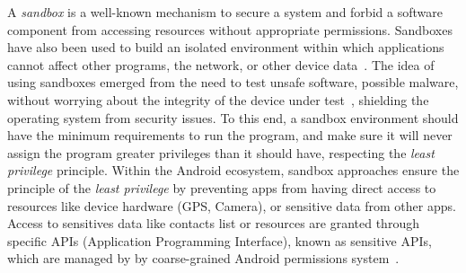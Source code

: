 A \emph{sandbox}
is a well-known mechanism to secure a system and forbid a software component from accessing
resources without appropriate permissions. Sandboxes have also been used to build an isolated
environment within which applications cannot affect other programs, the network, or other device
data~\cite{DBLP:journals/peerj-cs/MaassSCS16}. The idea of using sandboxes emerged from the
need to test unsafe software, possible malware, without worrying about the integrity of the
device under test~\cite{DBLP:conf/esorics/BordoniCS17}, shielding the operating system from security issues.
To this end, a sandbox environment should have the minimum requirements to run the
program, and make sure it will never assign the program greater privileges than it should have,
respecting the \emph{least privilege} principle.
Within the Android ecosystem, sandbox approaches ensure the principle
of the \emph{least privilege} by preventing apps from having direct access to resources like device hardware (GPS, Camera), or sensitive data from other apps. Access to sensitives data
like contacts list or resources are granted through specific APIs (Application Programming Interface), known as sensitive APIs, which are managed by by coarse-grained Android permissions system~\cite{DBLP:journals/corr/abs-2109-06613}.





